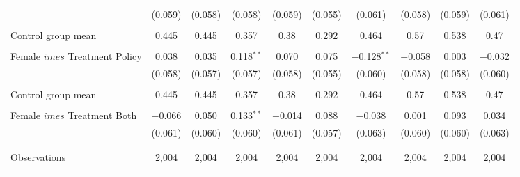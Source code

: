 \begin{tabular}{@{\extracolsep{5pt}}lccccccccc}
  & (0.059) & (0.058) & (0.058) & (0.059) & (0.055) & (0.061) & (0.058) & (0.059) & (0.061) \\ 
  & & & & & & & & & \\ 
 Control group mean & 0.445 & 0.445 & 0.357 & 0.38 & 0.292 & 0.464 & 0.57 & 0.538 & 0.47  \\ \hline \\[-1.8ex] Female $	imes$ Treatment Policy & 0.038 & 0.035 & 0.118$^{**}$ & 0.070 & 0.075 & $-$0.128$^{**}$ & $-$0.058 & 0.003 & $-$0.032 \\ 
  & (0.058) & (0.057) & (0.057) & (0.058) & (0.055) & (0.060) & (0.058) & (0.058) & (0.060) \\ 
  & & & & & & & & & \\ 
 Control group mean & 0.445 & 0.445 & 0.357 & 0.38 & 0.292 & 0.464 & 0.57 & 0.538 & 0.47  \\ \hline \\[-1.8ex] Female $	imes$ Treatment Both & $-$0.066 & 0.050 & 0.133$^{**}$ & $-$0.014 & 0.088 & $-$0.038 & 0.001 & 0.093 & 0.034 \\ 
  & (0.061) & (0.060) & (0.060) & (0.061) & (0.057) & (0.063) & (0.060) & (0.060) & (0.063) \\ 
  & & & & & & & & & \\ 
\hline \\[-1.8ex] 

Observations & 2,004 & 2,004 & 2,004 & 2,004 & 2,004 & 2,004 & 2,004 & 2,004 & 2,004 \\ 
\hline 
\hline \\[-1.8ex] 
\end{tabular} 